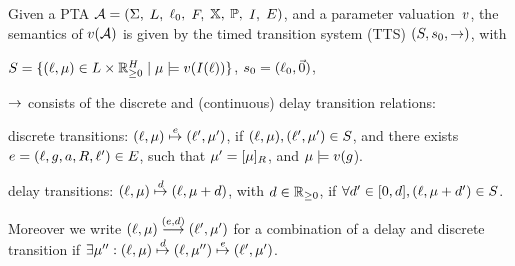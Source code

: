 \begin{tikzborder}{\cite{Gargantini16:validation}}
\begin{tikzborder}{\cite{gargantini_combinatorial_2017}}
\begin{tikzborder}{\cite{gargantini_combinatorial_2017}}
\begin{tikzborder}{\cite{garn2019}}
\begin{tikzborder}{\cite{arcaini2019achieving}}
\begin{tikzborder}{\cite{arcaini2019varivolution}}
\begin{tikzborder}{}
\begin{definition}
	Given a PTA $\mathcal{A} = (\Sigma,$ $L,$ $\ell_0,$ $F,$ $\mathbb{X},$ $\mathbb{P},$ $I,$ $E)$,
	and a parameter valuation~\(v\),
	the semantics of $v(\mathcal{A})$ is given by the timed transition system (TTS) $(S, s_0, {\rightarrow})$, with
	\begin{compactitem}
		\item $S = \{ (\ell, \mu) \in L \times {\mathbb{R}}_{\geq 0}^H \mid \mu \models v(I(\ell)) \}$, %
		 $s_0 = (\ell_0, \vec{0}) $,
		\item ${\rightarrow}$ consists of the discrete and (continuous) delay transition relations:
		\begin{ienumeration}
			\item discrete transitions: $(\ell,\mu) \stackrel{e}{\mapsto} (\ell',\mu')$, %
			if $(\ell, \mu) , (\ell',\mu') \in S$, and there exists $e = (\ell,g,a,R,\ell') \in E$, such that $\mu'= [\mu]_{R}$, and $\mu\models v(g$).
			\item delay transitions: $(\ell,\mu) \stackrel{d}{\mapsto} (\ell, \mu+d)$, with $d \in {\mathbb{R}}_{\geq 0}$, if $\forall d' \in [0, d], (\ell, \mu+d') \in S$.
		\end{ienumeration}
	\end{compactitem}
\end{definition}

Moreover we write $(\ell, \mu)\stackrel{(e, d)}{\longrightarrow} (\ell',\mu')$ for a combination of a delay and discrete transition if
$\exists \mu'' : (\ell,\mu) \stackrel{d}{\mapsto} (\ell,\mu'') \stackrel{e}{\mapsto} (\ell',\mu')$.


\end{tikzborder}
\end{tikzborder}
\end{tikzborder}
\end{tikzborder}
\end{tikzborder}
\end{tikzborder}
\end{tikzborder}
